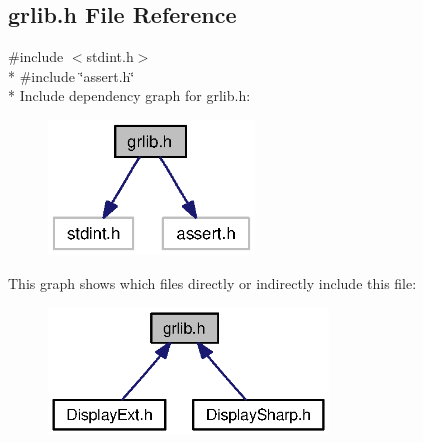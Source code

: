 \subsection{grlib.\+h File Reference}
\label{grlib_8h}
{\ttfamily \#include $<$stdint.\+h$>$}\\*
{\ttfamily \#include \char`\"{}assert.\+h\char`\"{}}\\*
Include dependency graph for grlib.\+h\+:
\nopagebreak
\begin{figure}[H]
\begin{center}
\leavevmode
\includegraphics[width=155pt]{grlib_8h__incl}
\end{center}
\end{figure}
This graph shows which files directly or indirectly include this file\+:
\nopagebreak
\begin{figure}[H]
\begin{center}
\leavevmode
\includegraphics[width=211pt]{grlib_8h__dep__incl}
\end{center}
\end{figure}
